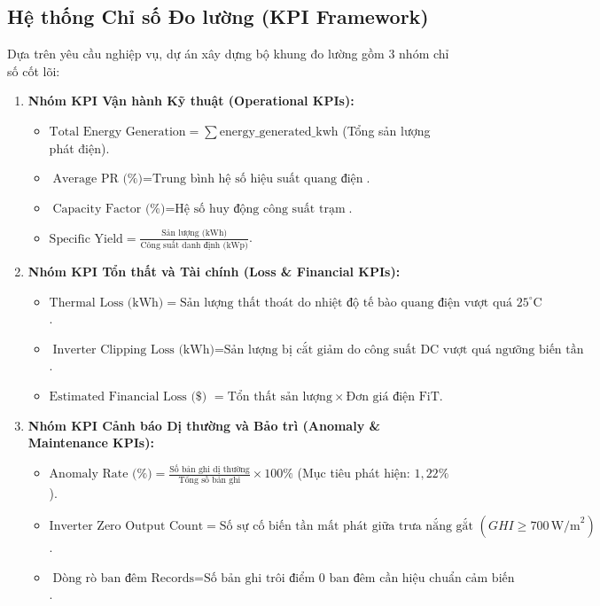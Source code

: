 \subsection{Hệ thống Chỉ số Đo lường (KPI Framework)}
Dựa trên yêu cầu nghiệp vụ, dự án xây dựng bộ khung đo lường gồm 3 nhóm chỉ số cốt lõi:
\begin{enumerate}[label=\arabic*., leftmargin=*]
    \item \textbf{Nhóm KPI Vận hành Kỹ thuật (Operational KPIs):}
    \begin{itemize}[noitemsep]
        \item $\text{Total Energy Generation} = \sum \text{energy\_generated\_kwh}$ (Tổng sản lượng phát điện).
        \item $\text{Average PR (\%)} = \text{Trung bình hệ số hiệu suất quang điện}$.
        \item $\text{Capacity Factor (\%)} = \text{Hệ số huy động công suất trạm}$.
        \item $\text{Specific Yield} = \frac{\text{Sản lượng (kWh)}}{\text{Công suất danh định (kWp)}}$.
    \end{itemize}
    \item \textbf{Nhóm KPI Tổn thất và Tài chính (Loss \& Financial KPIs):}
    \begin{itemize}[noitemsep]
        \item $\text{Thermal Loss (kWh)} = \text{Sản lượng thất thoát do nhiệt độ tế bào quang điện vượt quá } 25^\circ\text{C}$.
        \item $\text{Inverter Clipping Loss (kWh)} = \text{Sản lượng bị cắt giảm do công suất DC vượt quá ngưỡng biến tần}$.
        \item $\text{Estimated Financial Loss (\$) } = \text{Tổn thất sản lượng} \times \text{Đơn giá điện FiT}$.
    \end{itemize}
    \item \textbf{Nhóm KPI Cảnh báo Dị thường và Bảo trì (Anomaly \& Maintenance KPIs):}
    \begin{itemize}[noitemsep]
        \item $\text{Anomaly Rate (\%)} = \frac{\text{Số bản ghi dị thường}}{\text{Tổng số bản ghi}} \times 100\%$ (Mục tiêu phát hiện: $1{,}22\%$).
        \item $\text{Inverter Zero Output Count} = \text{Số sự cố biến tần mất phát giữa trưa nắng gắt } (GHI \ge 700\,\text{W/m}^2)$.
        \item $\text{Dòng rò ban đêm Records} = \text{Số bản ghi trôi điểm 0 ban đêm cần hiệu chuẩn cảm biến}$.
    \end{itemize}
\end{enumerate}

